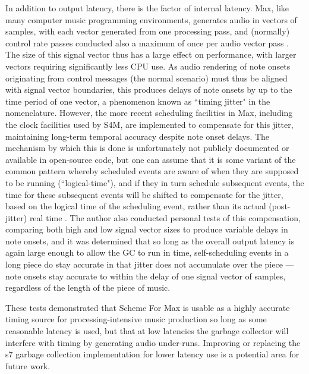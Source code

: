 \documentclass[acmsmall, anonymous, review]{acmart}
\begin{document}
In addition to output latency, there is the factor of internal latency.
Max, like many computer music programming environments, generates audio 
in vectors of samples, with
each vector generated from one processing pass, and (normally) control
rate passes conducted also a maximum of once per audio vector pass \cite{Puckette2002}.
The size of this signal vector thus has a large effect on performance, with larger
vectors requiring significantly less CPU use. As audio rendering of note onsets originating
from control messages (the normal scenario) must thus be aligned with 
signal vector boundaries, this produces delays of note onsets by up to
the time period of one vector, a phenomenon known as ``timing jitter" in the nomenclature.
However, the more recent scheduling facilities in Max, including the 
clock facilities used by S4M, are implemented to compensate for this jitter,
maintaining long-term temporal accuracy despite note onset delays. The mechanism
by which this is done is unfortunately not publicly documented or available
in open-source code, but one can assume that it is some variant of the common pattern 
whereby scheduled events are aware of when they are supposed to be running
(``logical-time"), and if they in turn schedule subsequent events, the time for these subsequent
events will be shifted to compensate for the jitter, based 
on the logical time of the scheduling event, rather than its
actual (post-jitter) real time \cite{Anderson1986}.
The author also conducted personal tests of 
this compensation, comparing both high and low signal vector sizes to produce
variable delays in note onsets, and it was determined
that so long as the overall output latency is again large enough to allow
the GC to run in time, self-scheduling events in a long piece do stay
accurate in that jitter does not accumulate over the piece --- 
note onsets stay accurate to within the delay of one signal vector of samples,
regardless of the length of the piece of music.

These tests demonstrated that Scheme For Max is usable as a highly accurate
timing source for processing-intensive music production so long as some
reasonable latency is used, but that at low latencies the garbage
collector will interfere with timing by generating audio under-runs.
Improving or replacing the s7 garbage collection implementation for 
lower latency use is a potential area for future work. 
\end{document}
